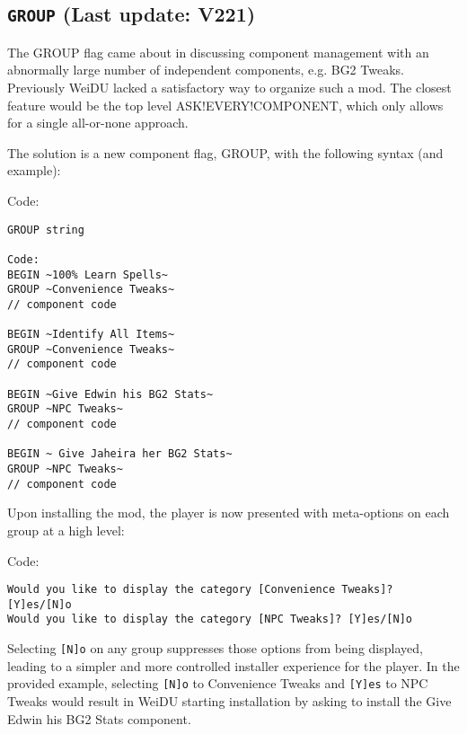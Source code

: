 \documentclass{article}
\def\DEFINE#1{{\tt \bf #1}\label{#1}\index{#1}}
\begin{document}
\subsection{\DEFINE{GROUP} (Last update: V221)}

The GROUP flag came about in discussing component management with an
abnormally large number of independent components, e.g. BG2 Tweaks. Previously
WeiDU lacked a satisfactory way to organize such a mod. The closest feature
would be the top level ASK!EVERY!COMPONENT, which only allows for a single
all-or-none approach.

The solution is a new component flag, GROUP, with the following syntax (and example):

Code:
\begin{verbatim}GROUP string

Code:
BEGIN ~100% Learn Spells~
GROUP ~Convenience Tweaks~
// component code

BEGIN ~Identify All Items~
GROUP ~Convenience Tweaks~
// component code

BEGIN ~Give Edwin his BG2 Stats~
GROUP ~NPC Tweaks~
// component code

BEGIN ~ Give Jaheira her BG2 Stats~
GROUP ~NPC Tweaks~
// component code
\end{verbatim}

Upon installing the mod, the player is now presented with meta-options on
each group at a high level:

Code:
\begin{verbatim}
Would you like to display the category [Convenience Tweaks]? [Y]es/[N]o
Would you like to display the category [NPC Tweaks]? [Y]es/[N]o
\end{verbatim}

Selecting \verb+[N]o+ on any group suppresses those options from being
displayed, leading to a simpler and more controlled installer experience for
the player. In the provided example, selecting \verb+[N]o+ to Convenience
Tweaks and \verb+[Y]es+ to NPC Tweaks would result in WeiDU starting
installation by asking to install the Give Edwin his BG2 Stats component.
\end{document}
